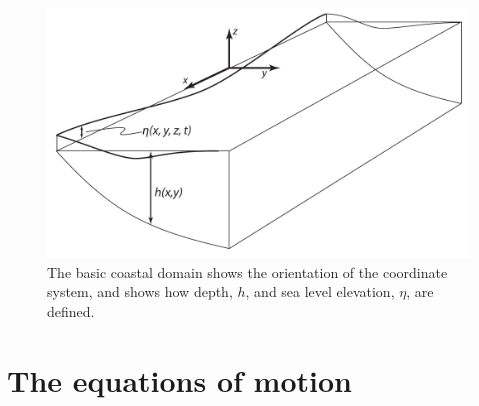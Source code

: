 \documentclass[11pt]{report}
\numberwithin{equation}{section}
\begin{document}
\begin{figure}[tb]
    \centering
    \includegraphics[width=5in]{basic_coastal_domain}   
    \caption{The basic coastal domain shows the orientation of the coordinate system, and shows how depth, $h$, and sea level elevation, $\eta$, are defined.}
    \label{fig:basic_coastal_domain}
\end{figure}

\newpage

\section{The equations of motion} 
\end{document}
